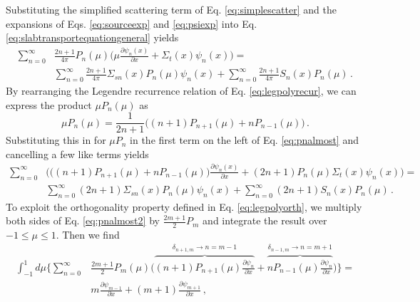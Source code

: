 Substituting the simplified scattering term of Eq. \ref{eq:simplescatter} and the expansions of Eqs. \ref{eq:sourceexp} and \ref{eq:psiexp} into Eq. \ref{eq:slabtransportequationgeneral} yields
\begin{equation}
 \begin{split}
   \sum^{\infty}_{n=0} &\frac{2n+1}{4\pi}P_{n}(\mu)  \Big (  \mu\frac{\partial \psi_n(x)}{\partial x} + \Sigma_t(x)\psi_n(x) \Big ) = \\
    & \sum^{\infty}_{n=0} \frac{2n+1}{4\pi}  \Sigma_{sn}(x)  P_n(\mu) \psi_n(x) + \sum^{\infty}_{n=0} \frac{2n+1}{4\pi} S_{n}(x)P_{n}(\mu) \, .
 \end{split}
 \label{eq:pnalmost}
\end{equation}
By rearranging the Legendre recurrence relation of Eq. \ref{eq:legpolyrecur}, we can express the product $\mu P_n(\mu)$ as
\begin{equation}
 \mu P_n(\mu) = \frac{1}{2n+1}\Big ( (n+1)P_{n+1}(\mu) + n P_{n-1}(\mu)\Big )\, .
\end{equation}
Substituting this in for $\mu P_n$ in the first term on the left of Eq. \ref{eq:pnalmost} and cancelling a few like terms yields
\begin{equation}
 \begin{split}
   \sum^{\infty}_{n=0} & \Bigg ( \Big ( (n+1)P_{n+1}(\mu) + nP_{n-1}(\mu) \Big )  \frac{\partial \psi_n(x)}{\partial x} + (2n+1)P_n(\mu) \Sigma_t(x)\psi_n(x) \Bigg ) = \\
    & \sum^{\infty}_{n=0} (2n+1) \Sigma_{sn}(x)  P_n(\mu) \psi_n(x) + \sum^{\infty}_{n=0} (2n+1)S_{n}(x)P_{n}(\mu) \, .
 \end{split}
 \label{eq:pnalmost2}
\end{equation}
To exploit the orthogonality property defined in Eq. \ref{eq:legpolyorth}, we multiply both sides of Eq. \ref{eq:pnalmost2} by $\frac{2m+1}{2}P_m$ and integrate the result over $-1 \leq \mu \leq 1$.  Then we find
\begin{equation}
 \begin{split}
   \int^{1}_{-1} d\mu \Bigg \{ \sum^{\infty}_{n=0} & \frac{2m+1}{2}P_m(\mu)\Bigg ( \overbrace{(n+1)P_{n+1}(\mu)\frac{\partial \psi_n}{\partial x}}^{\delta_{n+1,m}\to n=m-1} + \overbrace{nP_{n-1}(\mu)\frac{\partial \psi_n}{\partial x}}^{\delta_{n-1,m}\to n=m+1} \Bigg )   \Bigg \} = \\
   & m\frac{\partial \psi_{m-1}}{\partial x} + (m+1)\frac{\partial \psi_{m+1}}{\partial x} \, ,
 \end{split}
 \label{eq:pnalmost3a}
\end{equation}
